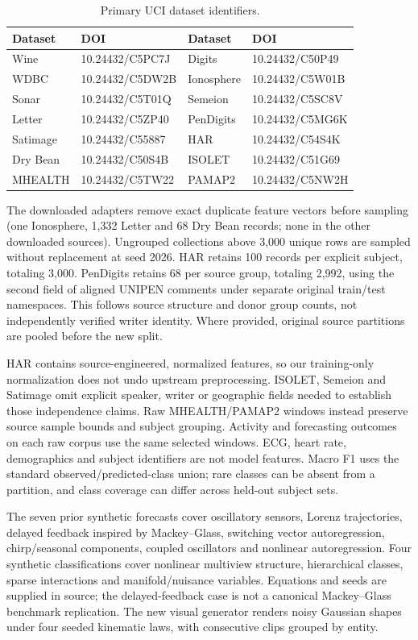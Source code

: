 \documentclass{article}
\begin{document}
\begin{table}[h]
\caption{Primary UCI dataset identifiers.}\centering\small
\begin{tabular}{ll@{\qquad}ll}\toprule
Dataset & DOI & Dataset & DOI\\\midrule
Wine & 10.24432/C5PC7J & Digits & 10.24432/C50P49\\
WDBC & 10.24432/C5DW2B & Ionosphere & 10.24432/C5W01B\\
Sonar & 10.24432/C5T01Q & Semeion & 10.24432/C5SC8V\\
Letter & 10.24432/C5ZP40 & PenDigits & 10.24432/C5MG6K\\
Satimage & 10.24432/C55887 & HAR & 10.24432/C54S4K\\
Dry Bean & 10.24432/C50S4B & ISOLET & 10.24432/C51G69\\
MHEALTH & 10.24432/C5TW22 & PAMAP2 & 10.24432/C5NW2H\\\bottomrule
\end{tabular}
\end{table}

The downloaded adapters remove exact duplicate feature vectors before sampling (one Ionosphere, 1,332 Letter and 68 Dry Bean records; none in the other downloaded sources). Ungrouped collections above 3,000 unique rows are sampled without replacement at seed 2026. HAR retains 100 records per explicit subject, totaling 3,000. PenDigits retains 68 per source group, totaling 2,992, using the second field of aligned UNIPEN comments under separate original train/test namespaces. This follows source structure and donor group counts, not independently verified writer identity. Where provided, original source partitions are pooled before the new split.

HAR contains source-engineered, normalized features, so our training-only normalization does not undo upstream preprocessing. ISOLET, Semeion and Satimage omit explicit speaker, writer or geographic fields needed to establish those independence claims. Raw MHEALTH/PAMAP2 windows instead preserve source sample bounds and subject grouping. Activity and forecasting outcomes on each raw corpus use the same selected windows. ECG, heart rate, demographics and subject identifiers are not model features. Macro F1 uses the standard observed/predicted-class union; rare classes can be absent from a partition, and class coverage can differ across held-out subject sets.

The seven prior synthetic forecasts cover oscillatory sensors, Lorenz trajectories, delayed feedback inspired by Mackey--Glass, switching vector autoregression, chirp/seasonal components, coupled oscillators and nonlinear autoregression. Four synthetic classifications cover nonlinear multiview structure, hierarchical classes, sparse interactions and manifold/nuisance variables. Equations and seeds are supplied in source; the delayed-feedback case is not a canonical Mackey--Glass benchmark replication. The new visual generator renders noisy Gaussian shapes under four seeded kinematic laws, with consecutive clips grouped by entity.
\end{document}
